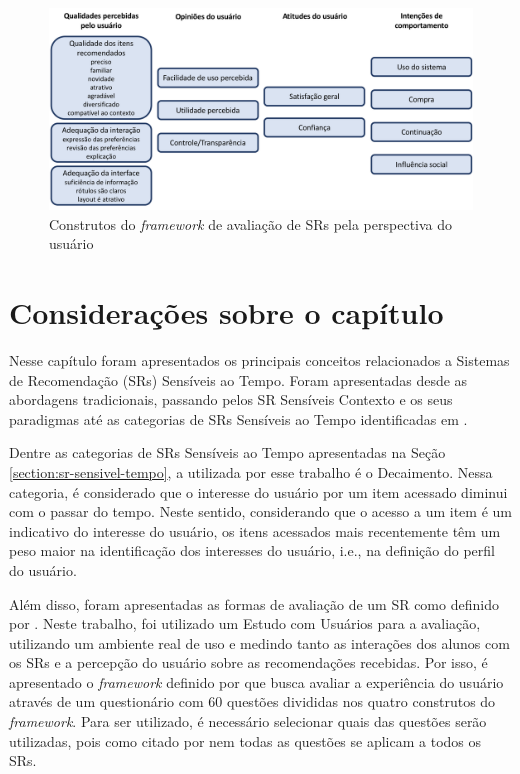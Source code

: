 \begin{figure}[htb]
  \caption{\label{fig:resque-framework}Construtos do \textit{framework} de avaliação de SRs pela perspectiva do usuário}
  \begin{center}
      \includegraphics[scale=0.4]{./Figuras/resque-framework-traduzido.png}
  \end{center}
\end{figure}

\section{Considerações sobre o capítulo}

Nesse capítulo foram apresentados os principais conceitos relacionados a Sistemas de Recomendação (SRs) Sensíveis ao Tempo.
Foram apresentadas desde as abordagens tradicionais, passando pelos SR Sensíveis Contexto e os seus paradigmas até as
categorias de SRs Sensíveis ao Tempo identificadas em .

Dentre as categorias de SRs Sensíveis ao Tempo apresentadas na Seção \ref{section:sr-sensivel-tempo}, a utilizada por esse
trabalho é o Decaimento. Nessa categoria, é considerado que o interesse do usuário por um item acessado diminui com o passar
do tempo. Neste sentido, considerando que o acesso a um item é um indicativo do interesse do usuário, os itens acessados
mais recentemente têm um peso maior na identificação dos interesses do usuário, i.e., na definição do perfil do usuário.

Além disso, foram apresentadas as formas de avaliação de um SR como definido por . Neste
trabalho, foi utilizado um Estudo com Usuários para a avaliação, utilizando um ambiente real de uso e medindo tanto
as interações dos alunos com os SRs e a percepção do usuário sobre as recomendações recebidas. Por isso, é
apresentado o \textit{framework} definido por  que busca avaliar a experiência do usuário através de um
questionário com 60 questões divididas nos quatro construtos do \textit{framework}. Para ser utilizado, é necessário
selecionar quais das questões serão utilizadas, pois como citado por  nem todas as questões se
aplicam a todos os SRs.
